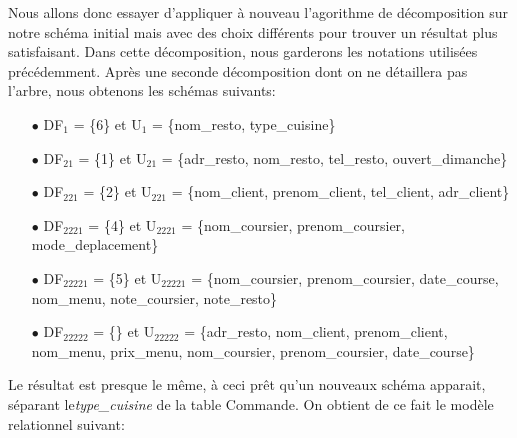 \documentclass[french]{article}
\begin{document}
            Nous allons donc essayer d'appliquer à nouveau l'agorithme de décomposition sur notre schéma initial mais avec des choix différents pour trouver un résultat plus satisfaisant. Dans cette décomposition, nous garderons les notations utilisées précédemment.\newline
            Après une seconde décomposition dont on ne détaillera pas l'arbre, nous obtenons les schémas suivants:\bigskip
            \begin{enumerate}
                \item[$\bullet$] DF$_{1}$ = \{6\} et U$_{1}$ = \{nom\_resto, type\_cuisine\}
                \item[$\bullet$] DF$_{21}$ = \{1\} et U$_{21}$ = \{adr\_resto, nom\_resto, tel\_resto, ouvert\_dimanche\}
                \item[$\bullet$] DF$_{221}$ = \{2\} et U$_{221}$ = \{nom\_client, prenom\_client, tel\_client, adr\_client\}
                \item[$\bullet$] DF$_{2221}$ = \{4\} et U$_{2221}$ = \{nom\_coursier, prenom\_coursier, mode\_deplacement\}
                \item[$\bullet$] DF$_{22221}$ = \{5\} et U$_{22221}$ = \{nom\_coursier, prenom\_coursier, date\_course, nom\_menu, \newline note\_coursier, note\_resto\} 
                \item[$\bullet$] DF$_{22222}$ = \{\} et U$_{22222}$ = \{adr\_resto, nom\_client, prenom\_client, nom\_menu, prix\_menu, nom\_coursier, prenom\_coursier, date\_course\}\bigskip
            \end{enumerate}
            Le résultat est presque le même, à ceci prêt qu'un nouveaux schéma apparait, séparant le\newline \emph{type\_cuisine} de la table Commande. On obtient de ce fait le modèle relationnel suivant:\bigskip
\end{document}
